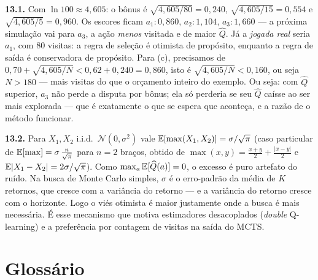 \documentclass[a4paper, 11pt]{article}
\newcommand{\Qh}{\widehat{Q}}
\begin{document}
{\small
\textbf{13.1.} Com $\ln 100 \approx 4{,}605$: o bônus é
$\sqrt{4{,}605/80}=0{,}240$, $\sqrt{4{,}605/15}=0{,}554$ e
$\sqrt{4{,}605/5}=0{,}960$. Os escores ficam
$a_1: 0{,}860$, $a_2: 1{,}104$, $a_3: 1{,}660$ --- a próxima simulação vai para
$a_3$, a ação \emph{menos} visitada e de maior $\Qh$. Já a \emph{jogada real}
seria $a_1$, com $80$ visitas: a regra de seleção é otimista de propósito,
enquanto a regra de saída é conservadora de propósito. Para (c), precisamos de
$0{,}70 + \sqrt{4{,}605/N} < 0{,}62 + 0{,}240 = 0{,}860$, isto é
$\sqrt{4{,}605/N} < 0{,}160$, ou seja $N > 180$ --- mais visitas do que o
orçamento inteiro do exemplo. Ou seja: com $\Qh$ superior, $a_3$ não perde a
disputa por bônus; ela só perderia se seu $\Qh$ caísse ao ser mais explorada
--- que é exatamente o que se espera que aconteça, e a razão de o método
funcionar.

\smallskip
\textbf{13.2.} Para $X_1,X_2$ i.i.d.\ $\mathcal{N}(0,\sigma^2)$ vale
$\mathbb{E}[\max(X_1,X_2)] = \sigma/\sqrt{\pi}$ (caso particular de
$\mathbb{E}[\max] = \sigma\,\tfrac{n}{\sqrt\pi}$ para $n=2$ braços, obtido de
$\max(x,y) = \tfrac{x+y}{2}+\tfrac{|x-y|}{2}$ e
$\mathbb{E}|X_1-X_2| = 2\sigma/\sqrt{\pi}$). Como $\max_a \E[\Qh(a)]=0$, o excesso é
puro artefato do ruído. Na busca de Monte Carlo simples, $\sigma$ é o
erro-padrão da média de $K$ retornos, que cresce com a variância do retorno ---
e a variância do retorno cresce com o horizonte. Logo o viés otimista é maior
justamente onde a busca é mais necessária. É esse mecanismo que motiva
estimadores desacoplados (\emph{double} Q-learning) e a preferência por
contagem de visitas na saída do MCTS.}

\section{Glossário}
\end{document}
